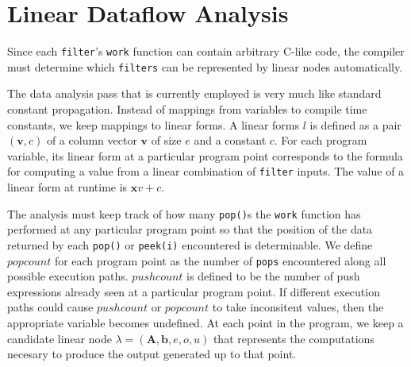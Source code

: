 \section{Linear Dataflow Analysis}
%
%
%



Since each {\tt filter}'s {\tt work} function can contain arbitrary C-like code,
the compiler must determine which {\tt filters} can be represented by linear nodes
automatically. 
 
The data analysis pass that is currently employed is very much like standard constant propagation. 
Instead of mappings from variables to compile time constants, we keep mappings to linear forms.
A linear forms $l$ is defined as a pair $({\mathbf v}, c)$ of a column vector $\mathbf{v}$ of size $e$ 
and a constant $c$. For each program variable, its linear form at a particular program 
point corresponds to the formula for computing a value from a linear 
combination of {\tt filter} inputs. The value of a linear form at runtime is 
${\mathbf xv} + c$.

The analysis must keep track of how many {\tt pop()}s the {\tt work} 
function has performed at any particular program point so that 
the position of the data returned by each {\tt pop()} or {\tt peek(i)} 
encountered is determinable. We define $popcount$ for each program point 
as the number of {\tt pops} encountered along all possible
execution paths. 
$pushcount$ is defined to be the number of push expressions already
seen at a particular program point.
If different execution paths could cause $pushcount$ or 
$popcount$ to take inconsitent values, then the appropriate
variable becomes undefined.
At each point in the program, we keep a candidate linear node 
$\lambda=({\mathbf A}, {\mathbf b}, e,o,u)$ that represents the 
computations necesary to produce the output generated up to that 
point.

